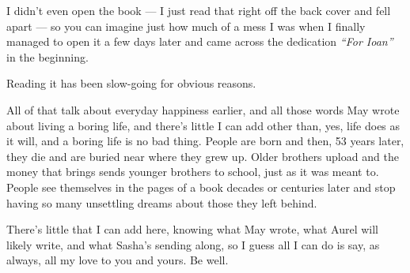 I didn't even open the book — I just read that right off the back cover and fell apart — so you can imagine just how much of a mess I was when I finally managed to open it a few days later and came across the dedication \emph{``For Ioan''} in the beginning.

Reading it has been slow-going for obvious reasons.

All of that talk about everyday happiness earlier, and all those words May wrote about living a boring life, and there's little I can add other than, yes, life does as it will, and a boring life is no bad thing. People are born and then, 53 years later, they die and are buried near where they grew up. Older brothers upload and the money that brings sends younger brothers to school, just as it was meant to. People see themselves in the pages of a book decades or centuries later and stop having so many unsettling dreams about those they left behind.

There's little that I can add here, knowing what May wrote, what Aurel will likely write, and what Sasha's sending along, so I guess all I can do is say, as always, all my love to you and yours. Be well.
